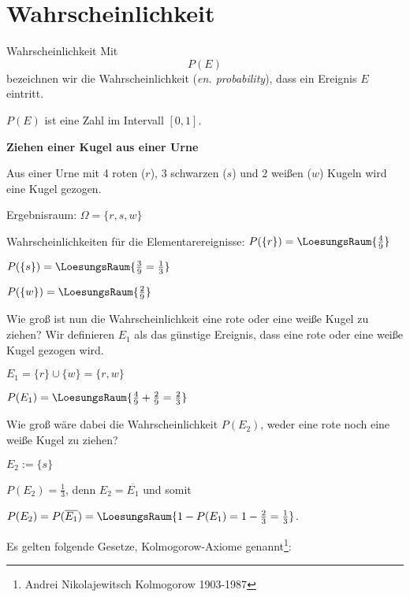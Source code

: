 
\section{Wahrscheinlichkeit}
\begin{definition}{Wahrscheinlichkeit}{}
Mit $$P(E)$$ bezeichnen wir die Wahrscheinlichkeit (\textit{en. probability}), dass ein Ereignis $E$ eintritt.

$P(E)$ ist eine Zahl im Intervall $[0,1]$.
\end{definition}

\begin{beispiel}{}{}\textbf{Ziehen einer Kugel aus einer Urne}

Aus einer Urne mit 4 roten ($r$), 3 schwarzen ($s$) und 2 weißen ($w$) Kugeln wird eine Kugel gezogen.

Ergebnisraum: $\Omega = \{r, s, w\}$



Wahrscheinlichkeiten für die Elementarereignisse:
\noTRAINER{\leserluft\leserluft}
$P(\{r\}) = \LoesungsRaum{\frac49}$

\noTRAINER{\leserluft\leserluft}
$P(\{s\}) = \LoesungsRaum{\frac39 = \frac13}$

\noTRAINER{\leserluft\leserluft}
$P(\{w\}) = \LoesungsRaum{\frac29}$

Wie groß ist nun die Wahrscheinlichkeit eine rote oder eine weiße Kugel zu ziehen?
Wir definieren $E_1$ als das günstige Ereignis, dass eine rote oder eine weiße Kugel gezogen wird.

$E_1 = \{r\} \cup \{w\} = \{r,w\}$

\noTRAINER{\leserluft\leserluft}
$P(E_1) = \LoesungsRaum{\frac49 + \frac29 = \frac23}$



Wie groß wäre dabei die Wahrscheinlichkeit $P(E_2)$, weder eine rote noch eine weiße Kugel zu ziehen?

$E_2 := \{s\}$

$P(E_2) = \frac13$, denn $E_2 = \overline{E_1}$ und somit

\noTRAINER{\leserluft\leserluft}
$P(E_2) = P(\overline{E_1}) = \LoesungsRaum{1 - P(E_1) = 1 - \frac23 = \frac13}$.

\end{beispiel}
\newpage


Es gelten folgende Gesetze, Kolmogorow-Axiome genannt\footnote{Andrei Nikolajewitsch
  Kolmogorow 1903-1987}:

